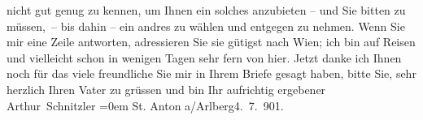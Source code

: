 \begin{ledgroupsized}[t]{13cm}
               nicht gut genug zu kennen, um Ihnen ein solches anzubieten – und Sie bitten zu
               müssen, – bis dahin – ein andres zu wählen und entgegen zu nehmen.\pend
           \pstart
           Wenn Sie mir eine Zeile antworten, adressieren Sie sie gütigst nach Wien; ich bin auf Reisen und vielleicht schon in wenigen Tagen
               sehr fern von hier.\pend
           \pstart
           Jetzt danke ich Ihnen noch für das viele freundliche \label{T_L01141_1v}\label{T_L01141_1h} Sie mir in Ihrem Briefe gesagt haben, bitte Sie,
               sehr herzlich Ihren Vater zu
               grüssen und bin\pend
           \pstart
           Ihr aufrichtig ergebener{\\[\baselineskip]}\spacefill\mbox{Arthur Schnitzler}\pend
           \leftskip=0em{}\pstart
           St. Anton a/Arlberg4. 7. 901.\pend
           
         
         \endnumbering{}\end{ledgroupsized}  \newcommand{\dateiname}{L01141}\newcommand{\titel}{Arthur Schnitzler an Edith Brandes, 4. 7. 1901}\newcommand{\editorInnen}{Martin Anton Müller und Gerd-Hermann Susen}
      